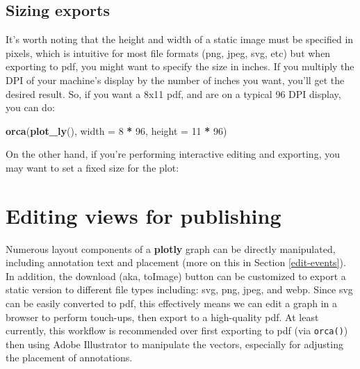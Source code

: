 \documentclass[
  12pt,
]{krantz}
\newenvironment{Shaded}{\begin{snugshade}}{\end{snugshade}}
\newcommand{\DataTypeTok}[1]{\textcolor[rgb]{0.13,0.29,0.53}{#1}}
\newcommand{\DecValTok}[1]{\textcolor[rgb]{0.00,0.00,0.81}{#1}}
\newcommand{\KeywordTok}[1]{\textcolor[rgb]{0.13,0.29,0.53}{\textbf{#1}}}
\newcommand{\NormalTok}[1]{#1}
\newcommand{\OperatorTok}[1]{\textcolor[rgb]{0.81,0.36,0.00}{\textbf{#1}}}
\newcommand{\StringTok}[1]{\textcolor[rgb]{0.31,0.60,0.02}{#1}}
\begin{document}
\hypertarget{sizing-exports}{%
\section{Sizing exports}\label{sizing-exports}}

It's worth noting that the height and width of a static image must be specified in pixels, which is intuitive for most file formats (png, jpeg, svg, etc) but when exporting to pdf, you might want to specify the size in inches. If you multiply the DPI of your machine's display by the number of inches you want, you'll get the desired result. So, if you want a 8x11 pdf, and are on a typical 96 DPI display, you can do:

\begin{Shaded}
\begin{Highlighting}[]
\KeywordTok{orca}\NormalTok{(}\KeywordTok{plot_ly}\NormalTok{(), }\DataTypeTok{width =} \DecValTok{8} \OperatorTok{*}\StringTok{ }\DecValTok{96}\NormalTok{, }\DataTypeTok{height =} \DecValTok{11} \OperatorTok{*}\StringTok{ }\DecValTok{96}\NormalTok{)}
\end{Highlighting}
\end{Shaded}

On the other hand, if you're performing interactive editing and exporting, you may want to set a fixed size for the plot:

\begin{Shaded}
\end{Shaded}

\hypertarget{editing-views}{%
\chapter{Editing views for publishing}\label{editing-views}}

Numerous layout components of a \textbf{plotly} graph can be directly manipulated, including annotation text and placement (more on this in Section \ref{edit-events}). In addition, the download (aka, toImage) button can be customized to export a static version to different file types including: svg, png, jpeg, and webp. Since svg can be easily converted to pdf, this effectively means we can edit a graph in a browser to perform touch-ups, then export to a high-quality pdf. At least currently, this workflow is recommended over first exporting to pdf (via \texttt{orca()}) then using Adobe Illustrator to manipulate the vectors, especially for adjusting the placement of annotations.
\end{document}
